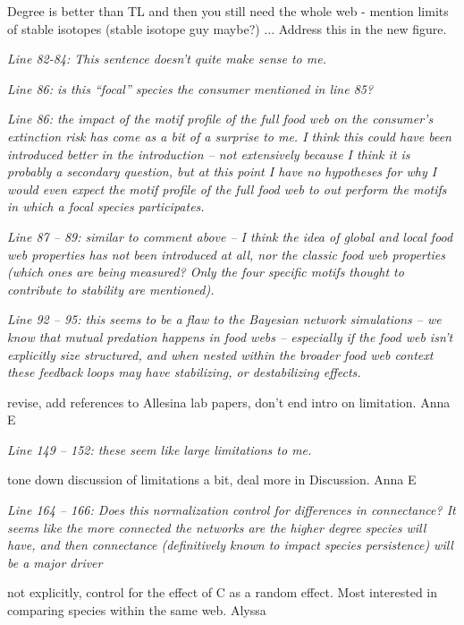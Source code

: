 \documentclass[12pt]{article}
\newcommand{\us}{\rm \setlength{\leftskip}{0.3cm} \setlength{\rightskip}{0.3cm}}
\newcommand{\them}{\it \setlength{\leftskip}{0cm} \setlength{\rightskip}{0cm}}
\begin{document}
\us Degree is better than TL and then you still need the whole web - mention limits of stable isotopes (stable isotope guy maybe?) ... Address this in the new figure. 

\them
Line 82-84: This sentence doesn’t quite make sense to me.

\us

\them
Line 86: is this “focal” species the consumer mentioned in line 85?

\us

\them
Line 86: the impact of the motif profile of the full food web on the consumer’s extinction risk has come as a bit of a surprise to me. I think this could have been introduced better in the introduction – not extensively because I think it is probably a secondary question, but at this point I have no hypotheses for why I would even expect the motif profile of the full food web to out perform the motifs in which a focal species participates.

\us

\them
Line 87 – 89: similar to comment above – I think the idea of global and local food web properties has not been introduced at all, nor the classic food web properties (which ones are being measured? Only the four specific motifs thought to contribute to stability are mentioned).

\us

\them
Line 92 – 95: this seems to be a flaw to the Bayesian network simulations – we know that mutual predation happens in food webs – especially if the food web isn’t explicitly size structured, and when nested within the broader food web context these feedback loops may have stabilizing, or destabilizing effects.

\us revise, add references to Allesina lab papers, don't end intro on limitation. Anna E

\them
Line 149 – 152: these seem like large limitations to me.

\us tone down discussion of limitations a bit, deal more in Discussion. Anna E

\them
Line 164 – 166: Does this normalization control for differences in connectance? It seems like the more connected the networks are the higher degree species will have, and then connectance (definitively known to impact species persistence) will be a major driver

\us not explicitly, control for the effect of C as a random effect. Most interested in comparing species within the same web. Alyssa
\end{document}
